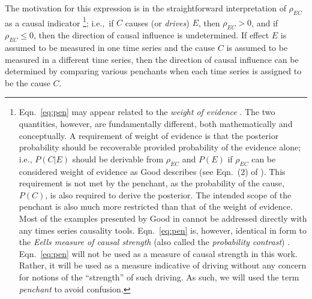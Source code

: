 \documentclass[twocolumn,aps,pre,groupedaddress]{revtex4-1}
\begin{document}
The motivation for this expression is in the straightforward interpretation of $\rho_{EC}$ as a causal indicator \footnote{Eqn.\ \ref{eq:pen} may appear related to the {\em weight of evidence} \cite{Good1984}.  The two quantities, however, are fundamentally different, both mathematically and conceptually.  A requirement of weight of evidence is that the posterior probability should be recoverable provided probability of the evidence alone; i.e., $P(C|E)$ should be derivable from $\rho_{EC}$ and $P(E)$ if $\rho_{EC}$ can be considered weight of evidence as Good describes (see Eqn.\ (2) of \cite{Good1984}).  This requirement is not met by the penchant, as the probability of the cause, $P(C)$, is also required to derive the posterior.  The intended scope of the penchant is also much more restricted than that of the weight of evidence.  Most of the examples presented by Good in \cite{Good1984} cannot be addressed directly with any times series causality tools.  Eqn.\ \ref{eq:pen} is, however, identical in form to the {\em Eells measure of causal strength} (also called the {\em probability contrast}) \cite{Illari2011}.  Eqn.\ \ref{eq:pen} will not be used as a measure of causal strength in this work.  Rather, it will be used as a measure indicative of driving without any concern for notions of the ``strength'' of such driving.  As such, we will used the term {\em penchant} to avoid confusion.}; i.e.,\ if $C$ causes (or {\em drives}) $E$, then $\rho_{EC} > 0$, and if $\rho_{EC} \le 0$, then the direction of causal influence is undetermined.  If effect $E$ is assumed to be measured in one time series and the cause $C$ is assumed to be measured in a different time series, then the direction of causal influence can be determined by comparing various penchants when each time series is assigned to be the cause $C$.  
\end{document}

